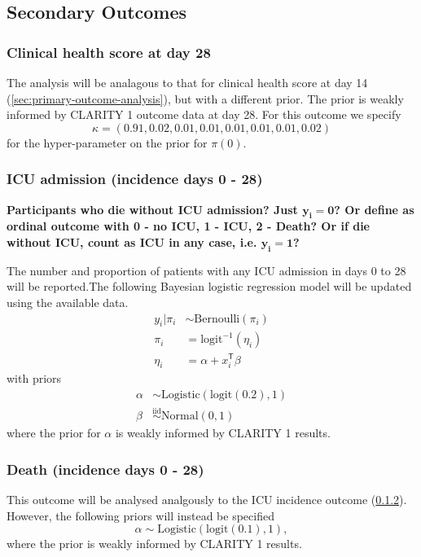 \documentclass[11pt,parskip=half-]{scrartcl}
\begin{document}
\subsection{Secondary Outcomes}

\subsubsection{Clinical health score at day 28}
The analysis will be analagous to that for clinical health score at day 14 (\ref{sec:primary-outcome-analysis}), but with a different prior. The prior is weakly informed by CLARITY 1 outcome data at day 28. For this outcome we specify
$$
    \kappa = (0.91, 0.02, 0.01, 0.01, 0.01, 0.01, 0.01, 0.02)
$$
for the hyper-parameter on the prior for $\pi(0)$.

\subsubsection{ICU admission (incidence days 0 - 28)}\label{sec:icu-analysis}

\textbf{Participants who die without ICU admission? Just $\mathbf{y_i=0}$? Or define as ordinal outcome with 0 - no ICU, 1 - ICU, 2 - Death? Or if die without ICU, count as ICU in any case, i.e. $\mathbf{y_i=1}$?}

The number and proportion of patients with any ICU admission in days 0 to 28 will be reported.The following Bayesian logistic regression model will be updated using the available data.
$$
    \begin{aligned}
        y_i|\pi_i & \sim \text{Bernoulli}(\pi_i)   \\
        \pi_i     & = \text{logit}^{-1}(\eta_i)    \\
        \eta_i    & = \alpha + x_i^\mathsf{T}\beta
    \end{aligned}
$$
with priors
$$
    \begin{aligned}
        \alpha & \sim \text{Logistic}(\text{logit}(0.2), 1)     \\
        \beta  & \overset{\text{iid}}{\sim} \text{Normal}(0, 1)
    \end{aligned}
$$
where the prior for $\alpha$ is weakly informed by CLARITY 1 results.

\subsubsection{Death (incidence days 0 - 28)}
This outcome will be analysed analgously to the ICU incidence outcome (\ref{sec:icu-analysis}). However, the following priors will instead be specified
$$
    \alpha \sim \text{Logistic}(\text{logit}(0.1), 1),
$$
where the prior is weakly informed by CLARITY 1 results.
\end{document}
